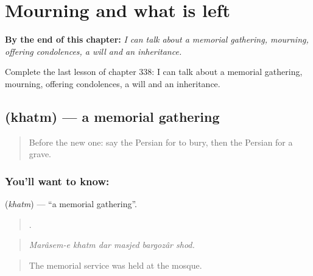 
\chapter{Mourning and what is left}
\label{ch:fa-mourning-and-what-is-left}

\begin{chapteropening}
\textbf{By the end of this chapter:} \emph{I can talk about a memorial gathering, mourning, offering condolences, a will and an inheritance.}

Complete the last lesson of chapter 338: I can talk about a memorial gathering, mourning, offering condolences, a will and an inheritance.
\end{chapteropening}

\section[\texorpdfstring{\fa{ختم} (khatm)}{ختم (khatm)}]{ (khatm) — a memorial gathering}

\label{lesson:FA-C338-khatm}



\begin{quote}
Before the new one: say the Persian for to bury, then the Persian for a grave.
\end{quote}

\subsection*{You'll want to know: }
\textbf{} (\emph{khatm}) — \textquotedblleft{}a memorial gathering\textquotedblright{}.

\begin{quote}
     .
\end{quote}

\begin{quote}
\emph{Marâsem-e khatm dar masjed bargozâr shod.}
\end{quote}

\begin{quote}
The memorial service was held at the mosque.
\end{quote}

